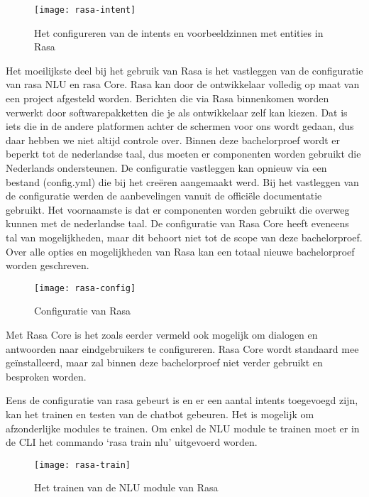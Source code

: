 \begin{figure}[H]
    \label{fig:rasa-intent}
    \centering
    \texttt{[image: rasa-intent]}
    \caption{Het configureren van de intents en voorbeeldzinnen met entities in Rasa}
\end{figure}

Het moeilijkste deel bij het gebruik van Rasa is het vastleggen van de configuratie van rasa NLU en rasa Core. Rasa kan door de ontwikkelaar volledig op maat van een project afgesteld worden. Berichten die via Rasa binnenkomen worden verwerkt door softwarepakketten die je als ontwikkelaar zelf kan kiezen. Dat is iets die in de andere platformen achter de schermen voor ons wordt gedaan, dus daar hebben we niet altijd controle over. Binnen deze bachelorproef wordt er beperkt tot de nederlandse taal, dus moeten er componenten worden gebruikt die Nederlands ondersteunen. De configuratie vastleggen kan opnieuw via een bestand (config.yml) die bij het creëren aangemaakt werd. Bij het vastleggen van de configuratie werden de aanbevelingen vanuit de officiële documentatie gebruikt. Het voornaamste is dat er componenten worden gebruikt die overweg kunnen met de nederlandse taal. De configuratie van Rasa Core heeft eveneens tal van mogelijkheden, maar dit behoort niet tot de scope van deze bachelorproef. Over alle opties en mogelijkheden van Rasa kan een totaal nieuwe bachelorproef worden geschreven. 

\begin{figure}[H]
    \label{fig:rasa-config}
    \centering
    \texttt{[image: rasa-config]}
    \caption{Configuratie van Rasa}
\end{figure}

Met Rasa Core is het zoals eerder vermeld ook mogelijk om dialogen en antwoorden naar eindgebruikers te configureren. Rasa Core wordt standaard mee geïnstalleerd, maar zal binnen deze bachelorproef niet verder gebruikt en besproken worden.

Eens de configuratie van rasa gebeurt is en er een aantal intents toegevoegd zijn, kan het trainen en testen van de chatbot gebeuren. Het is mogelijk om afzonderlijke modules te trainen. Om enkel de NLU module te trainen moet er in de CLI het commando ‘rasa train nlu’ uitgevoerd worden.

\begin{figure}[H]
    \label{fig:rasa-train}
    \centering
    \texttt{[image: rasa-train]}
    \caption{Het trainen van de NLU module van Rasa}
\end{figure}

